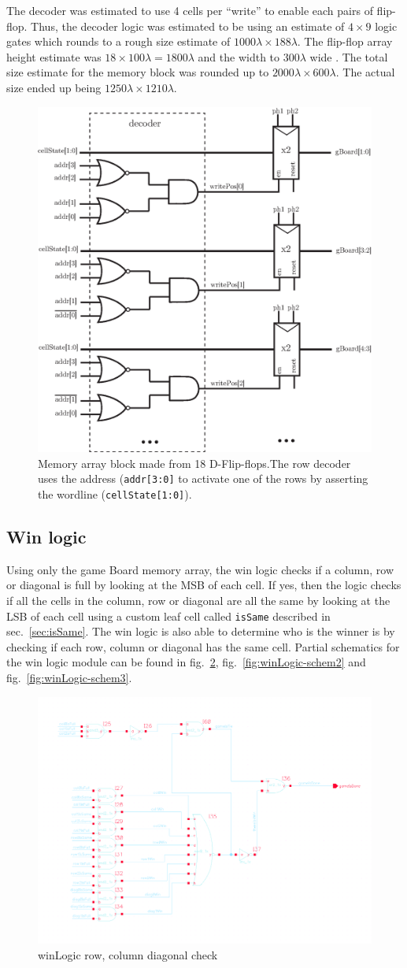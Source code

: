 \documentclass[]{article}
\begin{document}
The decoder was estimated to use 4 cells per ``write'' to enable each pairs of flip-flop. Thus, the decoder logic was estimated to be using an estimate of $4\times 9$ logic gates which rounds to a rough size estimate of  $ 1000\lambda \times 188 \lambda$. The flip-flop array height estimate was $18 \times 100\lambda = 1800\lambda$ and the width to $300\lambda$ wide . The total size estimate for the memory block was rounded up to $2000 \lambda \times 600 \lambda$. The actual size ended up being $1250 \lambda \times 1210\lambda$.
\begin{figure}
\centering
\includegraphics[width=.45\textwidth]{memArray}
\caption{Memory array block made from 18 D-Flip-flops.The row decoder uses the address (\texttt{addr[3:0]} to activate one of the rows by asserting the wordline (\texttt{cellState[1:0]}). }
\label{fig:memArray}
\end{figure}

\subsection{Win logic}
Using only the game Board memory array, the win logic checks if a column, row or diagonal is full by looking at the MSB of each cell. If yes, then the logic checks if all the cells in the column, row or diagonal are all the same by looking at the LSB of each cell using a custom  leaf cell called \texttt{isSame} described in sec.~\ref{sec:isSame}. The win logic is also able to determine who is the winner is by checking if each row, column or diagonal has the same cell. Partial schematics for the win logic module can be found in fig.~\ref{fig:winLogic-schem1}, fig.~\ref{fig:winLogic-schem2} and fig.~\ref{fig:winLogic-schem3}.
\begin{figure}
\centering
\includegraphics[width=.2\textwidth]{winLogic-schem_1}
\caption{winLogic row, column diagonal check}
\label{fig:winLogic-schem1}
\end{figure}
\end{document}

